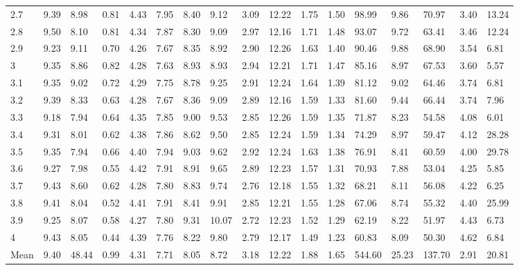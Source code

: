 \begin{adjustbox}{angle=90}
\begin{center}
\begin{tabular}{|l|llllllllllllllll|}
2.7&9.39&8.98&0.81&4.43&7.95&8.40&9.12&3.09&12.22&1.75&1.50&98.99&9.86&70.97&3.40&13.24  \\ 
2.8&9.50&8.10&0.81&4.34&7.87&8.30&9.09&2.97&12.16&1.71&1.48&93.07&9.72&63.41&3.46&12.24  \\ 
2.9&9.23&9.11&0.70&4.26&7.67&8.35&8.92&2.90&12.26&1.63&1.40&90.46&9.88&68.90&3.54&6.81  \\ 
3&9.35&8.86&0.82&4.28&7.63&8.93&8.93&2.94&12.21&1.71&1.47&85.16&8.97&67.53&3.60&5.57  \\ 
3.1&9.35&9.02&0.72&4.29&7.75&8.78&9.25&2.91&12.24&1.64&1.39&81.12&9.02&64.46&3.74&6.81  \\ 
3.2&9.39&8.33&0.63&4.28&7.67&8.36&9.09&2.89&12.16&1.59&1.33&81.60&9.44&66.44&3.74&7.96  \\ 
3.3&9.18&7.94&0.64&4.35&7.85&9.00&9.53&2.85&12.26&1.59&1.35&71.87&8.23&54.58&4.08&6.01  \\ 
3.4&9.31&8.01&0.62&4.38&7.86&8.62&9.50&2.85&12.24&1.59&1.34&74.29&8.97&59.47&4.12&28.28  \\ 
3.5&9.35&7.94&0.66&4.40&7.94&9.03&9.62&2.92&12.24&1.63&1.38&76.91&8.41&60.59&4.00&29.78  \\ 
3.6&9.27&7.98&0.55&4.42&7.91&8.91&9.65&2.89&12.23&1.57&1.31&70.93&7.88&53.04&4.25&5.85  \\ 
3.7&9.43&8.60&0.62&4.28&7.80&8.83&9.74&2.76&12.18&1.55&1.32&68.21&8.11&56.08&4.22&6.25  \\ 
3.8&9.41&8.04&0.52&4.41&7.91&8.41&9.91&2.85&12.21&1.55&1.28&67.06&8.74&55.32&4.40&25.99  \\ 
3.9&9.25&8.07&0.58&4.27&7.80&9.31&10.07&2.72&12.23&1.52&1.29&62.19&8.22&51.97&4.43&6.73  \\ 
4&9.43&8.05&0.44&4.39&7.76&8.22&9.80&2.79&12.17&1.49&1.23&60.83&8.09&50.30&4.62&6.84  \\ \hline \hline
Mean&9.40&48.44&0.99&4.31&7.71&8.05&8.72&3.18&12.22&1.88&1.65&544.60&25.23&137.70&2.91&20.81  \\ \hline
\end{tabular}
\end{center}
\end{adjustbox}





